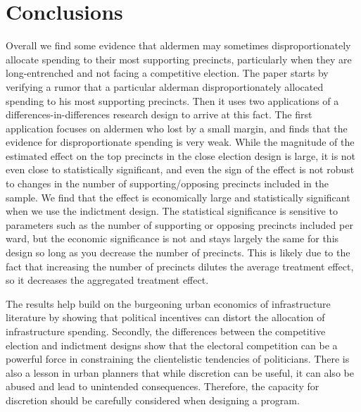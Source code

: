 \section*{Conclusions}

Overall we find some evidence that aldermen may sometimes disproportionately allocate spending to their most supporting precincts, particularly when they are long-entrenched and not facing a competitive election.
The paper starts by verifying a rumor that a particular alderman disproportionately allocated spending to his most supporting precincts.
Then it uses two applications of a differences-in-differences research design to arrive at this fact.
The first application focuses on aldermen who lost by a small margin, and finds that the evidence for disproportionate spending is very weak.
While the magnitude of the estimated effect on the top precincts in the close election design is large, it is not even close to statistically significant, and even the sign of the effect is not robust to changes in the number of supporting/opposing precincts included in the sample.
We find that the effect is economically large and statistically significant when we use the indictment design.
The statistical significance is sensitive to parameters such as the number of supporting or opposing precincts included per ward, but the economic significance is not and stays largely the same for this design so long as you decrease the number of precincts.
This is likely due to the fact that increasing the number of precincts dilutes the average treatment effect, so it decreases the aggregated treatment effect.

The results help build on the burgeoning urban economics of infrastructure literature by showing that political incentives can distort the allocation of infrastructure spending.
Secondly, the differences between the competitive election and indictment designs show that the electoral competition can be a powerful force in constraining the clientelistic tendencies of politicians.
There is also a lesson in urban planners that while discretion can be useful, it can also be abused and lead to unintended consequences.
Therefore, the capacity for discretion should be carefully considered when designing a program.
